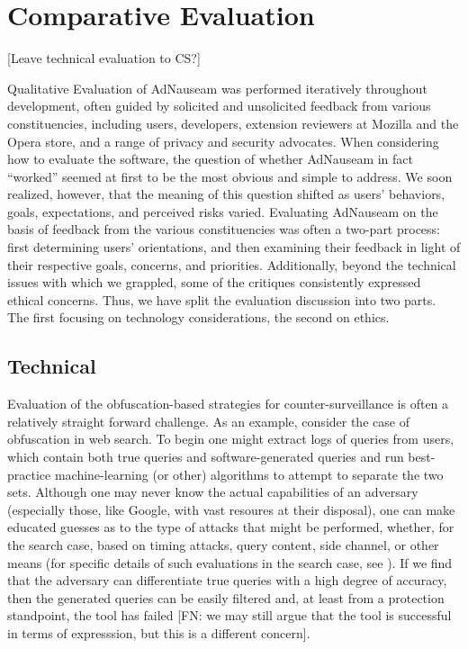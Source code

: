 \documentclass[conference]{IEEEtran}
\begin{document}
\section{Comparative Evaluation}

[Leave technical evaluation to CS?]

Qualitative Evaluation of AdNauseam was performed iteratively throughout development, often guided by solicited and unsolicited feedback from various constituencies, including users, developers, extension reviewers at Mozilla and the Opera store, and a range of privacy and security advocates. When considering how to evaluate the software, the question of whether AdNauseam in fact ``worked'' seemed at first to be the most obvious and simple to address. We soon realized, however, that the meaning of this question shifted as users' behaviors, goals, expectations, and perceived risks varied. Evaluating AdNauseam on the basis of feedback from the various constituencies was often a two-part process: first determining users' orientations, and then examining their feedback in light of their respective goals, concerns, and priorities. Additionally, beyond the technical issues with which we grappled, some of the critiques consistently expressed ethical concerns. Thus, we have split the evaluation discussion into two parts. The first focusing on technology considerations, the second on ethics.

\subsection{Technical}

Evaluation of the obfuscation-based strategies for counter-surveillance is often a relatively straight forward challenge. As an example, consider the case of obfuscation in web search. To begin one might extract logs of queries from users, which contain both true queries and software-generated queries and run best-practice machine-learning (or other) algorithms to attempt to separate the two sets. Although one may never know the actual capabilities of an adversary (especially those, like Google, with vast resoures at their disposal), one can make educated guesses as to the type of attacks that might be performed, whether, for the search case, based on timing attacks, query content, side channel, or other means (for specific details of such evaluations in the search case, see \cite{Gervais,Balsa,Peddinti}).  If we find that the adversary can differentiate true queries with a high degree of accuracy, then the generated queries can be easily filtered  and, at least from a protection standpoint, the tool has failed [FN: we may still argue that the tool is successful in terms of expresssion, but this is a different concern].
\end{document}
